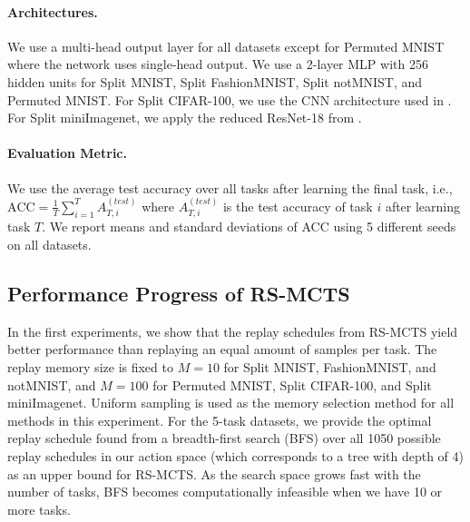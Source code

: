 %

\vspace{-3mm}
\paragraph{Architectures.} We use a multi-head output layer for all datasets except for Permuted MNIST where the network uses single-head output. We use a 2-layer MLP with 256 hidden units for Split MNIST, Split FashionMNIST, Split notMNIST, and Permuted MNIST. For Split CIFAR-100, we use the CNN architecture used in . For Split miniImagenet, we apply the reduced ResNet-18 from . 

\vspace{-3mm}
\paragraph{Evaluation Metric.} We use the average test accuracy over all tasks after learning the final task, i.e., $\text{ACC} = \frac{1}{T} \sum_{i=1}^{T} A_{T, i}^{(test)}$ where $A_{T, i}^{(test)}$ is the test accuracy of task $i$ after learning task $T$. We report means and standard deviations of ACC using 5 different seeds on all datasets. 



%
\subsection{Performance Progress of RS-MCTS}\label{paperC:sec:results_with_mcts}

In the first experiments, we show that the replay schedules from RS-MCTS yield better performance than replaying an equal amount of samples per task. 
The replay memory size is fixed to $M=10$ for Split MNIST, FashionMNIST, and notMNIST, and $M=100$ for Permuted MNIST, Split CIFAR-100, and Split miniImagenet. Uniform sampling is used as the memory selection method for all methods in this experiment.
For the 5-task datasets, we provide the optimal replay schedule found from a breadth-first search (BFS) over all 1050 possible replay schedules in our action space (which corresponds to a tree with depth of 4) as an upper bound for RS-MCTS. As the search space grows fast with the number of tasks, BFS becomes computationally infeasible when we have 10 or more tasks.


